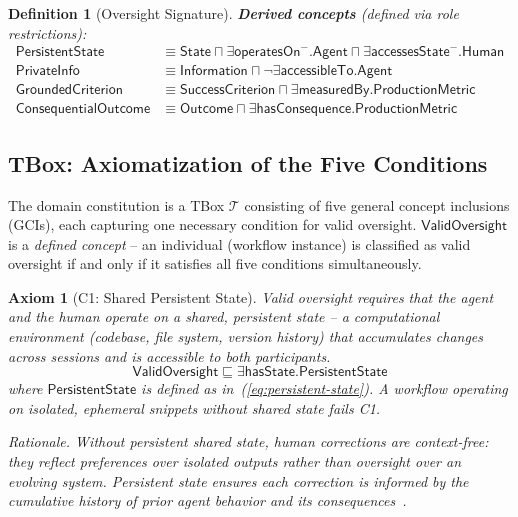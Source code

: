 \documentclass[11pt]{article}
\newtheorem{definition}{Definition}[section]
\newtheorem{axiom}{Axiom}[section]
\newcommand{\TBox}{\ensuremath{\mathcal{T}}\xspace}
\newcommand{\sqsub}{\sqsubseteq}
\begin{document}
\begin{definition}[Oversight Signature]
\medskip\noindent
\textbf{Derived concepts} (defined via role restrictions):
\begin{align}
  \mathsf{PersistentState} &\equiv \mathsf{State} \sqcap
    \exists\mathsf{operatesOn}^{-}.\mathsf{Agent} \sqcap
    \exists\mathsf{accessesState}^{-}.\mathsf{Human}
    \label{eq:persistent-state} \\[4pt]
  \mathsf{PrivateInfo} &\equiv \mathsf{Information} \sqcap
    \neg\exists\mathsf{accessibleTo}.\mathsf{Agent}
    \label{eq:private-info} \\[4pt]
  \mathsf{GroundedCriterion} &\equiv \mathsf{SuccessCriterion} \sqcap
    \exists\mathsf{measuredBy}.\mathsf{ProductionMetric}
    \label{eq:grounded-criterion} \\[4pt]
  \mathsf{ConsequentialOutcome} &\equiv \mathsf{Outcome} \sqcap
    \exists\mathsf{hasConsequence}.\mathsf{ProductionMetric}
    \label{eq:consequential-outcome}
\end{align}
\end{definition}

\subsection{TBox: Axiomatization of the Five Conditions}
\label{sec:tbox}

The domain constitution is a TBox \TBox consisting of five general concept inclusions (GCIs), each capturing one necessary condition for valid oversight.
$\mathsf{ValidOversight}$ is a \emph{defined concept} -- an individual (workflow instance) is classified as valid oversight if and only if it satisfies all five conditions simultaneously.

\begin{axiom}[C1: Shared Persistent State]
\label{ax:c1}
Valid oversight requires that the agent and the human operate on a shared, persistent state -- a computational environment (codebase, file system, version history) that accumulates changes across sessions and is accessible to both participants.
\begin{equation}
  \mathsf{ValidOversight} \sqsub
    \exists\mathsf{hasState}.\mathsf{PersistentState}
  \label{eq:c1}
\end{equation}
where $\mathsf{PersistentState}$ is defined as in~(\ref{eq:persistent-state}).
A workflow operating on isolated, ephemeral snippets without shared state fails C1.

\medskip\noindent
\emph{Rationale.}
Without persistent shared state, human corrections are context-free: they reflect preferences over isolated outputs rather than oversight over an evolving system.
Persistent state ensures each correction is informed by the cumulative history of prior agent behavior and its consequences~\citep{ovcharov2025citation,ovcharov2025statute}.
\end{axiom}
\end{document}

